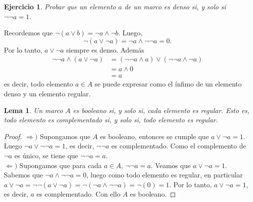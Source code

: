 \documentclass[12pt,letterpaper,titlepage]{article}
\newcommand{\xqed}[1]{%
  \leavevmode\unskip\penalty9999 \hbox{}\nobreak\hfill
  \quad\hbox{\ensuremath{#1}}}
\newtheorem{exe}{Ejercicio}
\newtheorem{lemma}{Lema}
\theoremstyle{definition}
\newtheorem*{soltemp}{Solución}
\newenvironment{sol}[1]{%
    \begin{soltemp}#1}{%
    \xqed{\blacksquare}\end{soltemp}%
}
\renewcommand\sup{\vee}
\renewcommand\inf{\wedge}
\newcommand\<{\langle}
\renewcommand\>{\rangle}
\begin{document}
\begin{exe}%
  Probar que un elemento $a$ de un marco es denso
  si, y solo si $\neg\neg a = 1$.
\end{exe}


Recordemos que $\neg(a\sup b)=\neg a\inf \neg b$.
Luego,
\[
  \neg(a\sup\neg a) = \neg a\inf\neg\neg a = 0
.\]
Por lo tanto, $a\sup\neg a$ siempre es denso.
Además
\begin{align*}
  \neg\neg a\inf(a\sup\neg a)
  &= (\neg\neg a\inf a)\sup(\neg\neg a\inf\neg a) \\
  &= a \inf 0 \\
  &= a
\end{align*}
es decir, todo elemento $a\in A$ se puede expresar como el ínfimo
de un elemento denso y un elemento regular.

\begin{lemma}
  Un marco $A$ es booleano si, y solo si, cada elemento es
  regular.
  Esto es, todo elemento es complementado si, y solo si, todo
  elemento es regular.
\end{lemma}
\begin{proof}
    $\Rightarrow )$ Supongamos que $A$ es booleano, entonces se cumple que $a\vee \neg a=1$. Luego $\neg a\vee \neg\neg a=1$, es decir, $\neg\neg a$ es complementado. Como el complemento de $\neg a$ es único, se tiene que $\neg \neg a=a$.\\
    $\Leftarrow)$ Supongamos que para cada $a\in A$, $\neg\neg a=a$. Veamos que $a\vee \neg a=1$. Sabemos que $\neg a\wedge\neg\neg a=0$, luego como todo elemento es regular, en particular $a\vee \neg a=\neg\neg (a\vee \neg a)=\neg(\neg a\wedge \neg\neg a)=\neg(0)=1$. Por lo tanto, $a\vee \neg a=1$, es decir, $a$ es complementado. Con ello $A$ es booleano.
\end{proof}
\end{document}
